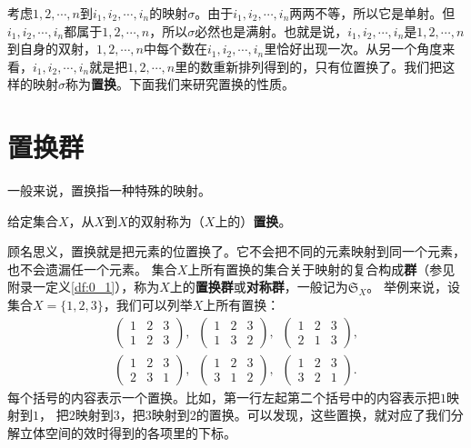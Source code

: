 \documentclass[12pt,UTF8]{ctexbook}
\begin{document}
考虑$1,2,\cdots, n$到$i_1,i_2,\cdots,i_n$的映射$\sigma$。由于$i_1,i_2,\cdots,i_n$两两不等，所以它是单射。但$i_1,i_2,\cdots,i_n$都属于$1,2,\cdots,n$，所以$\sigma$必然也是满射。也就是说，$i_1,i_2,\cdots,i_n$是$1,2,\cdots,n$到自身的双射，$1,2,\cdots,n$中每个数在$i_1,i_2,\cdots,i_n$里恰好出现一次。从另一个角度来看，$i_1,i_2,\cdots,i_n$就是把$1,2,\cdots,n$里的数重新排列得到的，只有位置换了。我们把这样的映射$\sigma$称为\textbf{置换}。下面我们来研究置换的性质。

\section{置换群}

一般来说，置换指一种特殊的映射。
\begin{df}\label{df:10_1}
    给定集合$X$，从$X$到$X$的双射称为（$X$上的）\textbf{置换}。
\end{df}
顾名思义，置换就是把元素的位置换了。它不会把不同的元素映射到同一个元素，也不会遗漏任一个元素。
集合$X$上所有置换的集合关于映射的复合构成\textbf{群}（参见附录一定义\ref{df:0_1}），称为$X$上的\textbf{置换群}或\textbf{对称群}，一般记为$\mathfrak{S}_X$。
举例来说，设集合$X = \{1, 2, 3\}$，我们可以列举$X$上所有置换：
\begin{align*}
    \begin{pmatrix}
    1 & 2 & 3 \\ 1 & 2 & 3
    \end{pmatrix}, \,\,\,\begin{pmatrix}
        1 & 2 & 3 \\ 1 & 3 & 2
    \end{pmatrix}, \,\,\,\begin{pmatrix}
        1 & 2 & 3 \\ 2 & 1 & 3
    \end{pmatrix},  \\
    \begin{pmatrix}
        1 & 2 & 3 \\ 2 & 3 & 1
    \end{pmatrix}, \,\,\,\begin{pmatrix}
        1 & 2 & 3 \\ 3 & 1 & 2
    \end{pmatrix}, \,\,\,\begin{pmatrix}
        1 & 2 & 3 \\ 3 & 2 & 1
    \end{pmatrix}.  
\end{align*}
每个括号的内容表示一个置换。比如，第一行左起第二个括号中的内容表示把$1$映射到$1$，
把$2$映射到$3$，把$3$映射到$2$的置换。可以发现，这些置换，就对应了我们分解立体空间的效时得到的各项里的下标。
\end{document}
